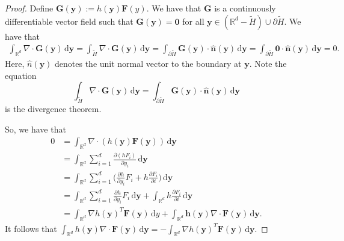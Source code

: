 \documentclass[10pt]{article}
\newcommand{\dee}{\mathrm{d}}
\newcommand{\ve}[1]{\mathbf{#1}}
\newcommand{\Real}{\mathbb{R}}
\begin{document}
\begin{itemize}
\begin{proof}
    Define $\ve{G}(\ve{y}) := h(\ve{y}) \ve{F}(y)$. We have that $\ve{G}$ is a continuously differentiable vector field such that $\ve{G}(\ve{y}) = \ve{0}$ for all $\ve{y} \in (\Real^d - \widetilde{H}) \cup \partial\widetilde{H}$. We have that
    \begin{align*}
      \int_{\Real^d} \nabla \cdot \ve{G}(\ve{y}) \, \dee\ve{y} 
      = \int_{\widetilde{H}} \nabla \cdot \ve{G}(\ve{y}) \, \dee\ve{y}
      = \int_{\partial \widetilde{H}} \ve{G}(\ve{y}) \cdot \hat{\ve{n}}(\ve{y})\, \dee\ve{y}
      = \int_{\partial \widetilde{H}} \ve{0} \cdot \hat{\ve{n}}(\ve{y})\, \dee\ve{y}
      = 0.
    \end{align*}
    Here, $\hat{n}(\ve{y})$ denotes the unit normal vector to the boundary at $\ve{y}$. Note the equation $$\int_{\widetilde{H}} \nabla \cdot \ve{G}(\ve{y}) \, \dee\ve{y}
    = \int_{\partial \widetilde{H}} \ve{G}(\ve{y}) \cdot \hat{\ve{n}}(\ve{y})\, \dee\ve{y} $$ is the divergence theorem.

    So, we have that
    \begin{align*}
      0 
      &= \int_{\Real^d} \nabla \cdot (h(\ve{y}) \ve{F}(\ve{y})) \, \dee\ve{y}  \\
      &= \int_{\Real^d} \sum_{i=1}^d \frac{\partial (h F_i) }{\partial y_i} \, \dee\ve{y} \\
      &= \int_{\Real^d} \sum_{i=1}^d \bigg( \frac{\partial h }{\partial y_i} F_i + h \frac{\partial F_i}{\partial i} \bigg) \, \dee\ve{y} \\
      &= \int_{\Real^d} \sum_{i=1}^d \frac{\partial h }{\partial y_i} F_i \, \dee\ve{y} + \int_{\Real^d} h \frac{\partial F_i}{\partial i} \, \dee\ve{y} \\
      &= \int_{\Real^d} \nabla h(\ve{y})^T \ve{F}(\ve{y})\, \dee y + \int_{\Real^d} \ve{h}(\ve{y}) \nabla \cdot \ve{F}(\ve{y}) \, \dee\ve{y}.
    \end{align*}
    It follows that $\int_{\Real^d} h(\ve{y}) \nabla \cdot \ve{F}(\ve{y})\, \dee\ve{y} = - \int_{\Real^d} \nabla h(\ve{y})^T \ve{F}(\ve{y})\, \dee\ve{y}$.    
  \end{proof}
\end{itemize}


  
\end{document}
